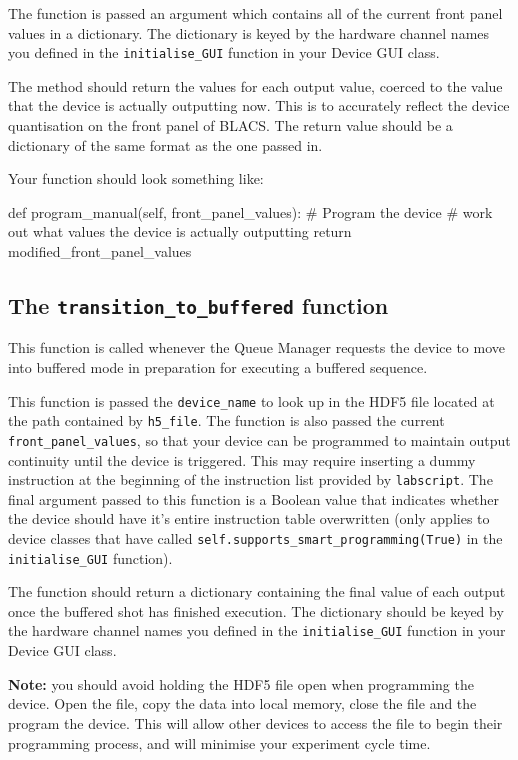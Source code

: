 \documentclass[12pt]{article}
\begin{document}
The function is passed an argument which contains all of the current front panel values in a dictionary.
The dictionary is keyed by the hardware channel names you defined in the \texttt{initialise\_GUI} function in your Device GUI class.

The method should return the values for each output value, coerced to the value that the device is actually outputting now.
This is to accurately reflect the device quantisation on the front panel of BLACS.
The return value should be a dictionary of the same format as the one passed in.

Your function should look something like:
\begin{python}
    def program_manual(self, front_panel_values):
        # Program the device
        # work out what values the device is actually outputting
        return modified_front_panel_values
\end{python}



\subsection{The \texttt{transition\_to\_buffered} function}\label{worker:transition_to_buffered}
This function is called whenever the Queue Manager requests the device to move into buffered mode in preparation for executing a buffered sequence.

This function is passed the \texttt{device\_name} to look up in the HDF5 file located at the path contained by \texttt{h5\_file}.
The function is also passed the current \texttt{front\_panel\_values}, so that your device can be programmed to maintain output continuity until the device is triggered.
This may require inserting a dummy instruction at the beginning of the instruction list provided by \texttt{labscript}.
The final argument passed to this function is a Boolean value that indicates whether the device should have it's entire instruction table overwritten (only applies to device classes that have called \texttt{self.supports\_smart\_programming(True)} in the \texttt{initialise\_GUI} function).

The function should return a dictionary containing the final value of each output once the buffered shot has finished execution.
The dictionary should be keyed by the hardware channel names you defined in the \texttt{initialise\_GUI} function in your Device GUI class.

\textbf{Note:} you should avoid holding the HDF5 file open when programming the device. Open the file, copy the data into local memory, close the file and the program the device.
This will allow other devices to access the file to begin their programming process, and will minimise your experiment cycle time.
\end{document}
